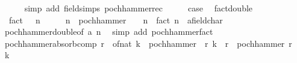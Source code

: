 \begin{isabellebody}
\ \ \ \ \isamarkupfalse%
\ {\isacharparenleft}{\kern0pt}simp\ add{\isacharcolon}{\kern0pt}\ field{\isacharunderscore}{\kern0pt}simps\ pochhammer{\isacharunderscore}{\kern0pt}rec{\isacharprime}{\kern0pt}{\isacharparenright}{\kern0pt}\isanewline
\ \ \isamarkupfalse%
\ \isamarkupfalse%
\ {\isacharquery}{\kern0pt}case\ \isacommand{{\isachardot}{\kern0pt}}\isamarkupfalse%
\isanewline
{}\isamarkupfalse%
%
\endisatagproof
{\isafoldproof}%
%
\isadelimproof
\isanewline
%
\endisadelimproof
\isanewline
{}\isamarkupfalse%
\ fact{\isacharunderscore}{\kern0pt}double{\isacharcolon}{\kern0pt}\isanewline
\ \ {\isachardoublequoteopen}fact\ {\isacharparenleft}{\kern0pt}{}\ {\isacharasterisk}{\kern0pt}\ n{\isacharparenright}{\kern0pt}\ {\isacharequal}{\kern0pt}\ {\isacharparenleft}{\kern0pt}{}\ {\isacharcircum}{\kern0pt}\ {\isacharparenleft}{\kern0pt}{}\ {\isacharasterisk}{\kern0pt}\ n{\isacharparenright}{\kern0pt}\ {\isacharasterisk}{\kern0pt}\ pochhammer\ {\isacharparenleft}{\kern0pt}{}\ {\isacharslash}{\kern0pt}\ {}{\isacharparenright}{\kern0pt}\ n\ {\isacharasterisk}{\kern0pt}\ fact\ n\ {\isacharcolon}{\kern0pt}{\isacharcolon}{\kern0pt}\ {\isacharprime}{\kern0pt}a{\isacharcolon}{\kern0pt}{\isacharcolon}{\kern0pt}field{\isacharunderscore}{\kern0pt}char{\isacharunderscore}{\kern0pt}{}{\isacharparenright}{\kern0pt}{\isachardoublequoteclose}\isanewline
%
\isadelimproof
\ \ %
\endisadelimproof
%
\isatagproof
{}\isamarkupfalse%
\ pochhammer{\isacharunderscore}{\kern0pt}double{\isacharbrackleft}{\kern0pt}of\ {\isachardoublequoteopen}{}{\isacharslash}{\kern0pt}{}{\isacharcolon}{\kern0pt}{\isacharcolon}{\kern0pt}{\isacharprime}{\kern0pt}a{\isachardoublequoteclose}\ n{\isacharbrackright}{\kern0pt}\ \isamarkupfalse%
\ {\isacharparenleft}{\kern0pt}simp\ add{\isacharcolon}{\kern0pt}\ pochhammer{\isacharunderscore}{\kern0pt}fact{\isacharparenright}{\kern0pt}%
\endisatagproof
{\isafoldproof}%
%
\isadelimproof
\isanewline
%
\endisadelimproof
\isanewline
{}\isamarkupfalse%
\ pochhammer{\isacharunderscore}{\kern0pt}absorb{\isacharunderscore}{\kern0pt}comp{\isacharcolon}{\kern0pt}\ {\isachardoublequoteopen}{\isacharparenleft}{\kern0pt}r\ {\isacharminus}{\kern0pt}\ of{\isacharunderscore}{\kern0pt}nat\ k{\isacharparenright}{\kern0pt}\ {\isacharasterisk}{\kern0pt}\ pochhammer\ {\isacharparenleft}{\kern0pt}{\isacharminus}{\kern0pt}\ r{\isacharparenright}{\kern0pt}\ k\ {\isacharequal}{\kern0pt}\ r\ {\isacharasterisk}{\kern0pt}\ pochhammer\ {\isacharparenleft}{\kern0pt}{\isacharminus}{\kern0pt}r\ {\isacharplus}{\kern0pt}\ {}{\isacharparenright}{\kern0pt}\ k{\isachardoublequoteclose}\isanewline

\end{isabellebody}
